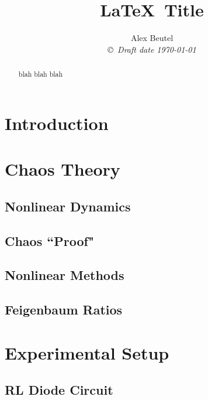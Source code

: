 \documentclass[12pt]{report}
\title{\LaTeX \ Title }
\author{Alex Beutel  \\
{\small\em \copyright \  Draft date \today }}
\date{ }
\begin{document}
\maketitle
\begin{abstract}
	blah blah blah
\end{abstract}
\tableofcontents
\listoffigures
\listoftables

\pagestyle{headings}

\pagestyle{plain}

\chapter{Introduction}



\chapter{Chaos Theory}

\section{Nonlinear Dynamics}
\label{sec: Nonlinear Dynamics}


\section{Chaos ``Proof"}
\label{sec: Chaos ``Proof"}


\section{Nonlinear Methods}
\label{sec: Nonlinear Methods}


\section{Feigenbaum Ratios}
\label{sec: Feigenbaum Ratios}


\chapter{Experimental Setup}

\section{RL Diode Circuit}
\label{sec:RL Diode Circuit}

\end{document}
